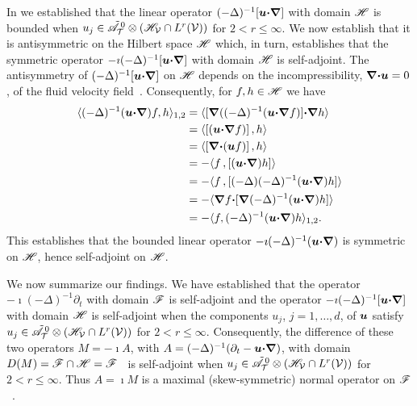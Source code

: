 \documentclass[amsa]{ipart}
\begin{document}
In  we established that the linear operator 
$(-\Delta)^{-1}[\boldsymbol{u}\mbox{\boldmath${\cdot}$}\mbox{\boldmath${\nabla}$}]$ with domain $\mathscr{H}$ is bounded when
$u_j\in\tilde{\mathscr{A}}^{\,0}_{\mathcal{T}}\otimes (\mathscr{H}_{\mathcal{V}}\cap L^r(\mathcal{V}))$ for $2<r\leq\infty$. We
now establish that it is antisymmetric on the Hilbert space $\mathscr{H}$
which, in turn, establishes that the symmetric operator
$-\imath(-\Delta)^{-1}[\boldsymbol{u}\mbox{\boldmath${\cdot}$}\mbox{\boldmath${\nabla}$}]$ with domain $\mathscr{H}$ is self-adjoint. The
antisymmetry of $(-\Delta)^{-1}[\boldsymbol{u}\mbox{\boldmath${\cdot}$}\mbox{\boldmath${\nabla}$}]$ on $\mathscr{H}$ 
depends on the incompressibility, $\mbox{\boldmath${\nabla}$}\mbox{\boldmath${\cdot}$}\boldsymbol{u}=0$, of the fluid
velocity field~\cite{Bhattacharya:AAP:1999:951}.  Consequently, for
$f,h\in\mathscr{H}$ we have~\cite{Bhattacharya:AAP:1999:951}    
%
\begin{align}\label{eq:Anti-sym_Sobolev}
 \langle(-\Delta)^{-1}(\vecu\bcdot\bnabla)f,h\rangle_{1,2}
       &=\langle[\bnabla((-\Delta)^{-1}(\vecu\bcdot\bnabla f)]\bcdot\bnabla h\rangle
       \\                              
       &=\langle[(\vecu\bcdot\bnabla f)]\,,h\rangle
       \notag\\
       &=\langle[\bnabla\bcdot(\vecu f)]\,,h\rangle
       \notag\\     
       &=-\langle f\,,[(\vecu\bcdot\bnabla)h]\rangle
       \notag\\
       &=-\langle f\,,[(-\Delta)(-\Delta)^{-1}(\vecu\bcdot\bnabla)h]\rangle
       \notag\\
       &=-\langle\bnabla f\bcdot[\bnabla(-\Delta)^{-1}(\vecu\bcdot\bnabla)h]\rangle
       \notag\\                              
       &= -\langle f,(-\Delta)^{-1}(\vecu\bcdot\bnabla)h\rangle_{1,2}.
       \notag
\end{align}
%
%
This establishes that the bounded linear operator
$-\imath(-\Delta)^{-1}(\boldsymbol{u}\mbox{\boldmath${\cdot}$}\mbox{\boldmath${\nabla}$})$ is symmetric on $\mathscr{H}$, hence
self-adjoint on $\mathscr{H}$.


We now summarize our findings. We have established that the
operator $-\imath(-\Delta)^{-1}\partial_t$ with domain $\mathscr{F}$ is self-adjoint and the
operator $-\imath(-\Delta)^{-1}[\boldsymbol{u}\mbox{\boldmath${\cdot}$}\mbox{\boldmath${\nabla}$}]$ with domain $\mathscr{H}$ is
self-adjoint when the components $u_j$, $j=1,\ldots,d$, of $\boldsymbol{u}$ satisfy
$u_j\in\tilde{\mathscr{A}}^{\,0}_{\mathcal{T}}\otimes (\mathscr{H}_{\mathcal{V}}\cap L^r(\mathcal{V}))$ for
$2<r\leq\infty$. Consequently, the difference of these two operators $M=-\imath A$,
with $A=(-\Delta)^{-1}(\partial_t-\boldsymbol{u}\mbox{\boldmath${\cdot}$}\mbox{\boldmath${\nabla}$})$, with domain
$D(M)=\mathscr{F}\cap\mathscr{H}=\mathscr{F}$~\cite{Stone:64} is self-adjoint when
$u_j\in\tilde{\mathscr{A}}^{\,0}_{\mathcal{T}}\otimes(\mathscr{H}_{\mathcal{V}}\cap L^r(\mathcal{V}))$ for $2<r\leq\infty$. Thus
$A=\imath M$ is a maximal (skew-symmetric) normal operator on
$\mathscr{F}$~\cite{Stone:64}.      
\end{document}

